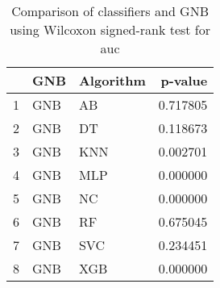 \begin{table}
\footnotesize
\caption{Comparison of classifiers and GNB using Wilcoxon signed-rank test for auc}
\label{tab:GNB wilcoxon AUC comparison}
\begin{tabular}{lllr}
\hline
 & GNB & Algorithm & p-value \\
\hline
1 & GNB & AB & 0.717805 \\
2 & GNB & DT & 0.118673 \\
3 & GNB & KNN & 0.002701 \\
4 & GNB & MLP & 0.000000 \\
5 & GNB & NC & 0.000000 \\
6 & GNB & RF & 0.675045 \\
7 & GNB & SVC & 0.234451 \\
8 & GNB & XGB & 0.000000 \\
\hline
\end{tabular}
\end{table}
